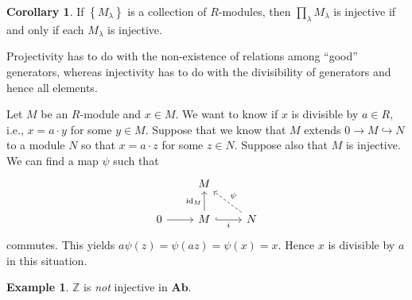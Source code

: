 \documentclass[10pt,letterpaper,cm]{nupset}
\theoremstyle{definition}
\newtheorem{exmp}[definition]{Example}
\theoremstyle{theorem}
\newtheorem{corollary}[definition]{Corollary}
\theoremstyle{remark}
\newcommand{\Z}{\mathbb Z}
\newcommand{\1}{\mathbf{1}}
\newcommand{\0}{\vec 0}
\DeclareMathOperator{\id}{\mathrm{id}}
\begin{document}
\begin{corollary}
If $\left\{M_{\lambda}\right\}$ is a collection of $R$-modules, then $\prod_{\lambda} M_{\lambda}$ is injective  if and only if each $M_{\lambda}$ is injective. 
\end{corollary}

\smallskip


Projectivity has to do with the non-existence of relations among ``good'' generators, whereas injectivity has to do with the divisibility of generators and hence all elements.

Let $M$ be an $R$-module and $x\in M$. We want to know if $x$ is divisible by $a\in R$, i.e., $x = a \cdot y$ for some $y\in M$. Suppose that we know that $M$ extends $0 \to M \hookrightarrow N$ to a module $N$ so that $x = a \cdot z$ for some $z \in N$. Suppose also that $M$ is injective. We can find  a map $\psi$ such that 
\[
\begin{tikzcd}
 & M &  \\
0 \arrow[r] & M \arrow[r, "i"', hook] \arrow[u, "\id_M"] & N \arrow[lu, "\psi"', dashed]
\end{tikzcd}
\] commutes. This yields $a\psi(z) = \psi(az) = \psi(x) = x$. Hence $x$ is divisible by $a$ in this situation.


\begin{exmp}
$\Z$ is \emph{not} injective in $\mathbf{Ab}$.
\end{exmp}
\end{document}
